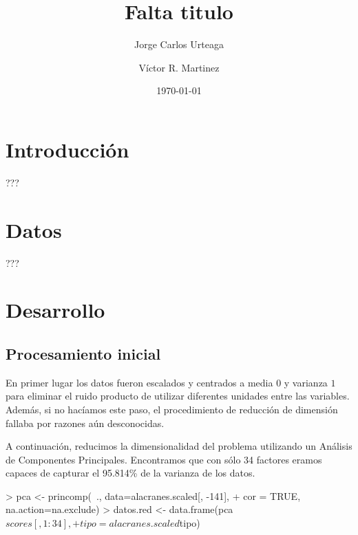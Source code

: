 \documentclass{article}
\author{Jorge Carlos Urteaga \and Víctor R. Martinez}
\title{Falta titulo}
\date{\today}
\begin{document}


\maketitle




\section{Introducción}
???

\section{Datos}
???

\section{Desarrollo}
\subsection{Procesamiento inicial}
En primer lugar los datos fueron escalados y centrados a media $0$ y varianza $1$ para eliminar el ruido producto de utilizar diferentes unidades entre las variables. Además, si no hacíamos este paso, el procedimiento de reducción de dimensión fallaba por razones aún desconocidas.

\begin{Schunk}
\end{Schunk}

A continuación, reducimos la dimensionalidad del problema utilizando un Análisis de Componentes Principales. Encontramos que con sólo 34 factores eramos capaces de capturar el 95.814\% de la varianza de los datos.

\begin{Schunk}
\begin{Sinput}
> pca <- princomp(~., data=alacranes.scaled[, -141],
+                 cor = TRUE, na.action=na.exclude)
> datos.red <- data.frame(pca$scores[,1:34],
+                         tipo = alacranes.scaled$tipo)
\end{Sinput}
\end{Schunk}
\end{document}
